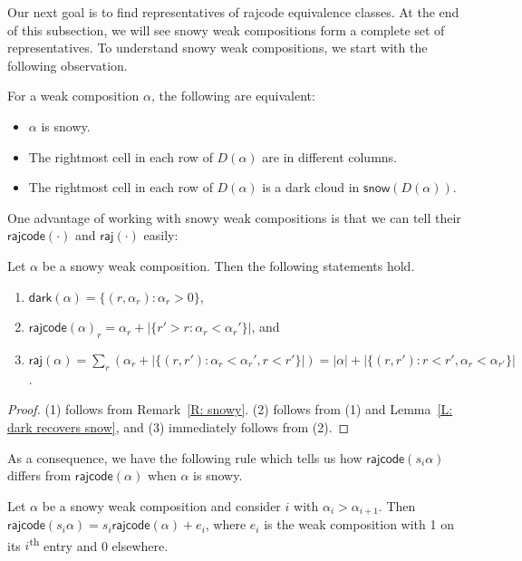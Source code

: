 \documentclass[ALCO]{cedram}
\newcommand{\dark}{\mathsf{dark}}
\newcommand{\snow}{\mathsf{snow}}
\newcommand{\rajcode}{\mathsf{rajcode}}
\newcommand{\raj}{\mathsf{raj}}
\begin{document}
Our next goal is to find representatives
of rajcode equivalence classes. 
At the end of this subsection, 
we will see snowy weak compositions form
a complete set of representatives. 
To understand snowy weak compositions, 
we start with the following observation. 

\begin{rem}
\label{R: snowy}
For a weak composition $\alpha$,
the following are equivalent:
\begin{itemize}
\item $\alpha$ is snowy.
\item The rightmost cell in each row of $D(\alpha)$
are in different columns. 
\item The rightmost cell in each row of $D(\alpha)$
is a dark cloud in $\snow(D(\alpha))$. 
\end{itemize}
\end{rem}

One advantage of working with snowy weak compositions
is that 
we can tell their 
$\rajcode(\cdot)$ and $\raj(\cdot)$ easily:
\begin{lemma}
\label{L: dark, rajcode and raj of snowy weak composition}
Let $\alpha$ be a snowy weak composition.
Then the following statements hold.
\begin{enumerate}
\item $\dark(\alpha) = \{(r,\alpha_r): \alpha_r > 0\}$,\label{snowy.weak.1}
\item $\rajcode(\alpha)_r = \alpha_r + |\{r' > r: \alpha_r < \alpha_r'\}|$, and \label{snowy.weak.2}
\item $\raj(\alpha) = \sum_r (\alpha_r + |\{(r, r'): \alpha_r < \alpha_r', r < r'\}|) = |\alpha| + |\{(r, r'): r < r', \alpha_r < \alpha_{r'}\}|$.\label{snowy.weak.3}
\end{enumerate}
\end{lemma}
\begin{proof}
(1) follows from Remark~\ref{R: snowy}.
(2) follows from (1) and Lemma~\ref{L: dark recovers snow}, and 
(3) immediately follows from (2). 
\end{proof}

As a consequence, we have the following rule which tells us 
how $\rajcode(s_i\alpha)$ differs from 
$\rajcode(\alpha)$ when $\alpha$ is snowy. 

\begin{cor}
\label{C: snowy changes}
Let $\alpha$ be a snowy weak composition and consider $i$ with $\alpha_i > \alpha_{i+1}$.
Then $\rajcode(s_i\alpha) = s_i\rajcode(\alpha) + e_i$,
where $e_i$ is the weak composition with
1 on its $i$\textsuperscript{th} entry and 0 elsewhere.
\end{cor}
\end{document}

